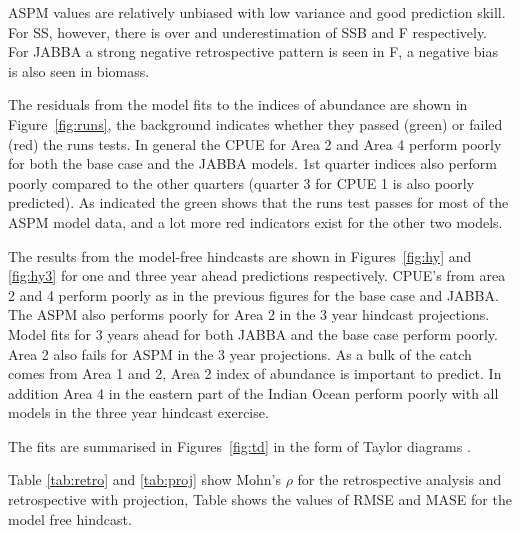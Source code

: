 \documentclass[a4paper]{article}
\begin{document}
ASPM values are relatively unbiased with low variance and good prediction skill. For SS, however, there is over and underestimation of SSB and F respectively. For JABBA a strong negative retrospective pattern is seen in F, a negative bias is also seen in biomass.

The residuals from the model fits to the indices of abundance are shown in Figure~\ref{fig:runs}, the background indicates whether they passed (green) or failed (red) the runs tests. In general the CPUE for Area 2 and Area 4 perform poorly for both the base case and the JABBA models. 1st quarter indices also perform poorly compared to the other quarters (quarter 3 for CPUE 1 is also poorly predicted). As indicated the green shows that the runs test passes for most of the ASPM model data, and a lot more red indicators exist for the other two models.  

The results from the model-free hindcasts are shown in Figures~\ref{fig:hy} and \ref{fig:hy3} for one and three year ahead predictions respectively. CPUE's from area 2 and 4 perform poorly as in the previous figures for the base case and JABBA. The ASPM also performs poorly for Area 2 in the 3 year hindcast projections. Model fits for 3 years ahead for both JABBA and the base case perform poorly. Area 2 also fails for ASPM in the 3 year projections. As a bulk of the catch comes from Area 1 and 2, Area 2 index of abundance is important to predict. In addition Area 4 in the eastern part of the Indian Ocean perform poorly with all models in the three year hindcast exercise.   

The fits are summarised in Figures~\ref{fig:td} in the form of Taylor diagrams \citep{taylor2001summarizing}. 


Table \ref{tab:retro} and  \ref{tab:proj} show Mohn's $\rho$ for the retrospective analysis and retrospective with projection, Table \label{tab:rmse} shows the values of RMSE and \label{tab:mase} MASE for the model free hindcast.
\end{document}
